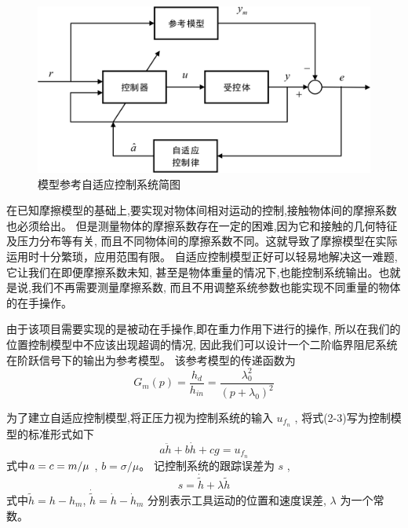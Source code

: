 \begin{figure}[!ht]
  \centering
  \includegraphics[scale=0.6]{chapter02/pic/2-2}
  \caption{模型参考自适应控制系统简图}
  \label{fig:2-2}
  \vspace{-0.3cm}
\end{figure}

在已知摩擦模型的基础上,要实现对物体间相对运动的控制,接触物体间的摩擦系数也必须给出。
但是测量物体的摩擦系数存在一定的困难,因为它和接触的几何特征及压力分布等有关,
而且不同物体间的摩擦系数不同。这就导致了摩擦模型在实际运用时十分繁琐，应用范围有限。
自适应控制模型正好可以轻易地解决这一难题,它让我们在即便摩擦系数未知,
甚至是物体重量的情况下,也能控制系统输出。也就是说,我们不再需要测量摩擦系数,
而且不用调整系统参数也能实现不同重量的物体的在手操作。

由于该项目需要实现的是被动在手操作,即在重力作用下进行的操作,
所以在我们的位置控制模型中不应该出现超调的情况,
因此我们可以设计一个二阶临界阻尼系统在阶跃信号下的输出为参考模型。
该参考模型的传递函数为
\begin{equation}
  {G_m}(p) = \frac{{{h_d}}}{{{h_{in}}}} = \frac{{\lambda _0^2}}{{{{\left( {p + {\lambda _0}} \right)}^2}}}
  \label{equ:2-4}
\end{equation}

为了建立自适应控制模型,将正压力视为控制系统的输入 $u_{f_n}$ ,
将式(2-3)写为控制模型的标准形式如下
\begin{equation}
  a\ddot h + b\dot h + cg = {u_{{f_n}}}
  \label{euq:2-5}
\end{equation}
式中$a = c = {m \mathord{\left/
{\vphantom {m \mu }} \right.
\kern-\nulldelimiterspace} \mu }$ , $b = \sigma /\mu $。
记控制系统的跟踪误差为 $s$ ,
\begin{equation}
  s = \dot{\tilde h}  + \lambda \tilde h
  \label{euq:2-6}
\end{equation}
式中$\tilde h = h - {h_m}$, $\dot{\tilde h} = \dot h - {\dot h_m}$
分别表示工具运动的位置和速度误差, $\lambda$ 为一个常数。

